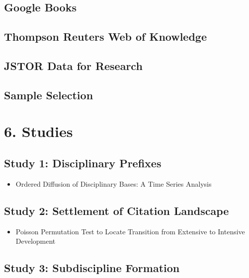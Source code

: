 \subsection{Google Books}\label{google-books}

\subsection{Thompson Reuters Web of
Knowledge}\label{thompson-reuters-web-of-knowledge}

\subsection{JSTOR Data for Research}\label{jstor-data-for-research}

\subsection{Sample Selection}\label{sample-selection}

\section{6. Studies}\label{studies}

\subsection{Study 1: Disciplinary
Prefixes}\label{study-1-disciplinary-prefixes}

\begin{itemize}
\tightlist
\item
  Ordered Diffusion of Disciplinary Bases: A Time Series Analysis
\end{itemize}

\subsection{Study 2: Settlement of Citation
Landscape}\label{study-2-settlement-of-citation-landscape}

\begin{itemize}
\tightlist
\item
  Poisson Permutation Test to Locate Transition from Extensive to
  Intensive Development
\end{itemize}

\subsection{Study 3: Subdiscipline
Formation}\label{study-3-subdiscipline-formation}

